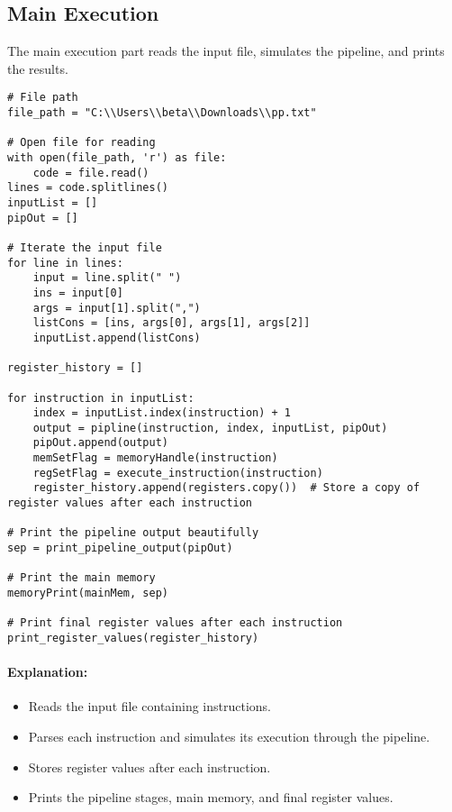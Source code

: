\documentclass{article}
\begin{document}
\subsection{Main Execution}
The main execution part reads the input file, simulates the pipeline, and prints the results.

\begin{lstlisting}[caption={Main Execution}]
# File path
file_path = "C:\\Users\\beta\\Downloads\\pp.txt"

# Open file for reading
with open(file_path, 'r') as file:
    code = file.read()
lines = code.splitlines()
inputList = []
pipOut = []

# Iterate the input file
for line in lines:
    input = line.split(" ")
    ins = input[0]
    args = input[1].split(",")
    listCons = [ins, args[0], args[1], args[2]]
    inputList.append(listCons)

register_history = []

for instruction in inputList:
    index = inputList.index(instruction) + 1
    output = pipline(instruction, index, inputList, pipOut)
    pipOut.append(output)
    memSetFlag = memoryHandle(instruction)
    regSetFlag = execute_instruction(instruction)
    register_history.append(registers.copy())  # Store a copy of register values after each instruction

# Print the pipeline output beautifully
sep = print_pipeline_output(pipOut)

# Print the main memory
memoryPrint(mainMem, sep)

# Print final register values after each instruction
print_register_values(register_history)
\end{lstlisting}

\paragraph{Explanation:}
\begin{itemize}
    \item Reads the input file containing instructions.
    \item Parses each instruction and simulates its execution through the pipeline.
    \item Stores register values after each instruction.
    \item Prints the pipeline stages, main memory, and final register values.
\end{itemize}
\end{document}
